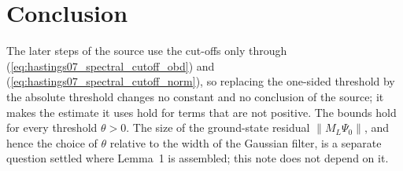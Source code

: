 \documentclass{article}
\begin{document}
\section{Conclusion}

The later steps of the source use the cut-offs only through
(\ref{eq:hastings07_spectral_cutoff_obd}) and
(\ref{eq:hastings07_spectral_cutoff_norm}), so replacing the one-sided
threshold by the absolute threshold changes no constant and no conclusion of
the source; it makes the estimate it uses hold for terms that are not
positive. The bounds hold for every threshold $\theta>0$. The size of the
ground-state residual $\lVert M_L\Psi_0\rVert$, and hence the choice of
$\theta$ relative to the width of the Gaussian filter, is a separate question
settled where Lemma~1 is assembled; this note does not depend on it.



\end{document}
